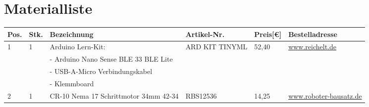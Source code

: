 \documentclass[12pt,a4paper]{scrbook}
\begin{document}
\cleardoublepage
{}




\chapter{Materialliste}
\begin{center}
	\fontsize{8}{10}\selectfont
	\begin{tabularx}{\textwidth}{|p{0.4cm}|p{0.4cm}|X|X|p{1cm}|X|}
		\hline 
		\textbf{Pos.} & \textbf{Stk.} & \textbf{Bezeichnung} & \textbf{Artikel-Nr.} & \textbf{Preis[€]} & \textbf{Bestelladresse} \\ \hline
		1 & 1 & Arduino Lern-Kit: & ARD KIT TINYML & 52,40 & \href{https://www.reichelt.de}{www.reichelt.de} \\
		&   & - Arduino Nano Sense BLE 33 BLE Lite & & & \\ 
		&   &- USB-A-Micro Verbindungskabel & & & \\
		&   &- Klemmboard & & & \\
		\hline
		2 & 1 & CR-10 Nema 17 Schrittmotor 34mm 42-34 & RBS12536 & 14,25 & \href{https://www.roboter-bausatz.de/p/cr-10-nema-17-schrittmotor-34mm-42-34}{www.roboter-bausatz.de} \\
		\hline
	

\end{tabularx}
\end{center}
\end{document}
